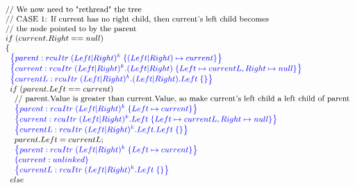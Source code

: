\[\small
\begin{array}{@{}l@{}}
    \;\;\text{// We now need to "rethread" the tree}\\
    \;\;\text{// CASE 1: If current has no right child, then current's left child becomes}\\
    \;\;\text{//         the node pointed to by the parent}\\
    \;\;if\; (current.Right == null)\\
    \;\;\{\\
        \;\;\;\;\specline{parent:rcuItr\; (Left|Right)^{k} \; \{ (Left|Right) \mapsto current\} }\\
        \;\;\;\;\specline{current:rcuItr\; (Left|Right)^{k}.(Left|Right) \; \{Left\mapsto currentL , Right \mapsto null\} }\\
        \;\;\;\;\specline{currentL:rcuItr\; (Left|Right)^{k}.(Left|Right).Left \; \{\} }\\
        
            \;\;\;\;if\; (parent.Left == current)\\
                \;\;\;\;\;\;\text{// parent.Value is greater than current.Value, so make current's left child a left child of parent}\\
                \;\;\;\;\;\;\specline{parent:rcuItr\; (Left|Right)^{k} \; \{ Left \mapsto current\} }\\
                \;\;\;\;\;\;\specline{current:rcuItr\; (Left|Right)^{k}.Left \; \{Left\mapsto currentL, Right\mapsto null\} }\\
                \;\;\;\;\;\;\specline{currentL:rcuItr\; (Left|Right)^{k}.Left.Left \; \{\} }\\
                \;\;\;\;\;\;parent.Left = currentL;\\
                \;\;\;\;\;\;\specline{parent:rcuItr\; (Left|Right)^{k} \; \{ Left \mapsto current\} }\\
                \;\;\;\;\;\;\specline{current:unlinked}\\
                \;\;\;\;\;\;\specline{currentL:rcuItr\; (Left|Right)^{k}.Left \; \{\} }\\
                
            \;\;\;\;else \\


\end{array}\]
